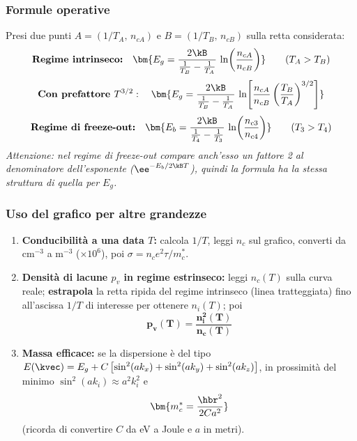 \subsubsection*{Formule operative}
Presi due punti $A=(1/T_A,\,n_{cA})$ e $B=(1/T_B,\,n_{cB})$ sulla retta considerata:
\[ \textbf{Regime intrinseco:}\quad \bm{E_g = \frac{2\kB}{\frac{1}{T_B}-\frac{1}{T_A}}\,\ln\!\left(\frac{n_{cA}}{n_{cB}}\right)}
   \qquad (T_A>T_B) \]
\[ \textbf{Con prefattore } T^{3/2}:\quad \bm{E_g = \frac{2\kB}{\frac{1}{T_B}-\frac{1}{T_A}}\,\ln\!\left[\frac{n_{cA}}{n_{cB}}\left(\frac{T_B}{T_A}\right)^{3/2}\right]} \]
\[ \textbf{Regime di freeze-out:}\quad \bm{E_b = \frac{2\kB}{\frac{1}{T_4}-\frac{1}{T_3}}\,\ln\!\left(\frac{n_{c3}}{n_{c4}}\right)}
   \qquad (T_3>T_4) \]
\textit{Attenzione: nel regime di freeze-out compare anch'esso un fattore 2 al denominatore dell'esponente ($\ee^{-E_b/2\kB T}$), quindi la formula ha la stessa struttura di quella per $E_g$.}

\subsubsection*{Uso del grafico per altre grandezze}
\begin{enumerate}
    \item \textbf{Conducibilità a una data $T$:} calcola $1/T$, leggi $n_c$ sul grafico, converti da cm$^{-3}$ a m$^{-3}$ ($\times10^6$), poi $\sigma = n_ce^2\tau/m_c^*$.
    \item \textbf{Densità di lacune $p_v$ in regime estrinseco:} leggi $n_c(T)$ sulla curva reale; \textbf{estrapola} la retta ripida del regime intrinseco (linea tratteggiata) fino all'ascissa $1/T$ di interesse per ottenere $n_i(T)$; poi
    \[ \bm{p_v(T) = \frac{n_i^2(T)}{n_c(T)}} \]
    \item \textbf{Massa efficace:} se la dispersione è del tipo $E(\kvec)=E_g+C\left[\sin^2(ak_x)+\sin^2(ak_y)+\sin^2(ak_z)\right]$, in prossimità del minimo $\sin^2(ak_i)\approx a^2k_i^2$ e
    \[ \bm{m_c^* = \frac{\hbr^2}{2Ca^2}} \]
    (ricorda di convertire $C$ da eV a Joule e $a$ in metri).
\end{enumerate}


